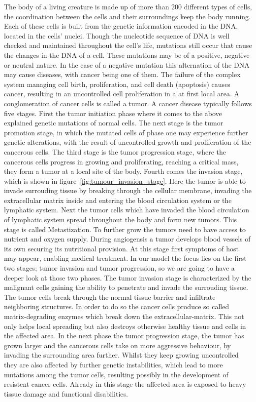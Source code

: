The body of a living creature is made up of more than 200 different types of cells, the coordination between the cells and their surroundings keep the body running. Each of these cells is built from the genetic information encoded in the DNA, located in the cells' nuclei. Though the nucleotide sequence of DNA is well checked and maintained throughout the cell's life, mutations still occur that cause the changes in the DNA of a cell. These mutations may be of a positive, negative or neutral nature. In the case of a negative mutation this alternation of the DNA may cause diseases, with cancer being one of them. The failure of the complex system managing cell birth, proliferation, and cell death (apoptosis) causes cancer, resulting in an uncontrolled cell proliferation in a at first local area. A conglomeration of cancer cells is called a tumor. \newline
A cancer disease typically follows five stages. First the tumor initiation phase where it comes to the above explained genetic mutations of normal cells. The next stage is the tumor promotion stage, in which the mutated cells of phase one may experience further genetic alterations, with the result of uncontrolled growth and proliferation of the cancerous cells. The third stage is the tumor progression stage, where the cancerous cells progress in growing and proliferating, reaching a critical mass, they form a tumor at a local site of the body. Fourth comes the invasion stage, which is shown in figure~\ref{fig:tumour_invasion_stage}. Here the tumor is able to invade surrouding tissue by breaking through the cellular membrane, invading the extracellular matrix inside and entering the blood circulation system or the lymphatic system. Next the tumor cells which have invaded the blood circulation of lymphatic system spread throughout the body and form new tumors. This stage is called Metastization. To further grow the tumors need to have access to nutrient and oxygen supply. During angiogensis a tumor develops blood vessels of its own securing its nutritional provision. At this stage first symptoms of host may appear, enabling medical treatment.\newline
In our model the focus lies on the first two stages; tumor invasion and tumor progression, so we are going to have a deeper look at those two phases. The tumor invasion stage is characterized by the malignant cells gaining the ability to penetrate and invade the surrouding tissue. The tumor cells break through the normal tissue barrier and infiltrate neighboring structures. In order to do so the cancer cells produce so called matrix-degrading enzymes which break down the extracellular-matrix. This not only helps local spreading but also destroys otherwise healthy tissue and cells in the affected area. In the next phase the tumor progression stage, the tumor has grown larger and the cancerous cells take on more aggressive behaviour, by invading the surrounding area further. Whilst they keep growing uncontrolled they are also affected by further genetic instabilities, which lead to more mutations among the tumor cells, resulting possibly in the development of resistent cancer cells. Already in this stage the affected area is exposed to heavy tissue damage and functional disabilities.\newline
